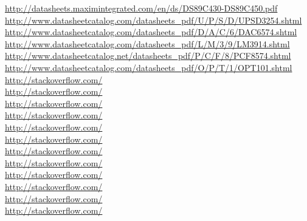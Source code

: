 \documentclass[10pt,a4paper,final]{article}
\begin{document}
\begin{flushleft}
\url{http://datasheets.maximintegrated.com/en/ds/DS89C430-DS89C450.pdf} \\
\url{http://www.datasheetcatalog.com/datasheets_pdf/U/P/S/D/UPSD3254.shtml} \\
\url{http://www.datasheetcatalog.com/datasheets_pdf/D/A/C/6/DAC6574.shtml} \\
\url{http://www.datasheetcatalog.com/datasheets_pdf/L/M/3/9/LM3914.shtml} \\
\url{http://www.datasheetcatalog.net/datasheets_pdf/P/C/F/8/PCF8574.shtml} \\
\url{http://www.datasheetcatalog.com/datasheets_pdf/O/P/T/1/OPT101.shtml} \\
\url{http://stackoverflow.com/} \\
\url{http://stackoverflow.com/} \\
\url{http://stackoverflow.com/} \\
\url{http://stackoverflow.com/} \\
\url{http://stackoverflow.com/} \\
\url{http://stackoverflow.com/} \\
\url{http://stackoverflow.com/} \\
\url{http://stackoverflow.com/} \\
\url{http://stackoverflow.com/} \\
\url{http://stackoverflow.com/} \\
\url{http://stackoverflow.com/} \\
\url{http://stackoverflow.com/} \\
\end{flushleft}
\end{document}
